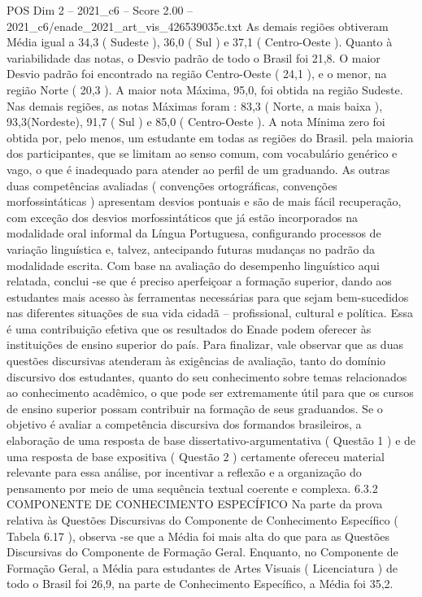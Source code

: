 \begin{textsample}{POS Dim 2 – 2021\_c6 – Score 2.00 – 2021\_c6/enade\_2021\_art\_vis\_426539035c.txt}
As demais regiões obtiveram Média igual a 34,3 ( Sudeste ), 36,0 ( Sul ) e 37,1 ( Centro-Oeste ).
Quanto à variabilidade das notas, o Desvio padrão de todo o Brasil foi 21,8.
O maior Desvio padrão foi encontrado na região Centro-Oeste ( 24,1 ), e o menor, na região Norte ( 20,3 ).
A maior nota Máxima, 95,0, foi obtida na região Sudeste.
Nas demais regiões, as notas Máximas foram : 83,3 ( Norte, a mais baixa ), 93,3(Nordeste), 91,7 ( Sul ) e 85,0 ( Centro-Oeste ).
A nota Mínima zero foi obtida por, pelo menos, um estudante em todas as regiões do Brasil. pela maioria dos participantes, que se limitam ao senso comum, com vocabulário genérico e vago, o que é inadequado para atender ao perfil de um graduando.
As outras duas competências avaliadas ( convenções ortográficas, convenções morfossintáticas ) apresentam desvios pontuais e são de mais fácil recuperação, com exceção dos desvios morfossintáticos que já estão incorporados na modalidade oral informal da Língua Portuguesa, configurando processos de variação linguística e, talvez, antecipando futuras mudanças no padrão da modalidade escrita.
Com base na avaliação do desempenho linguístico aqui relatada, conclui -se que é preciso aperfeiçoar a formação superior, dando aos estudantes mais acesso às ferramentas necessárias para que sejam bem-sucedidos nas diferentes situações de sua vida cidadã – profissional, cultural e política.
Essa é uma contribuição efetiva que os resultados do Enade podem oferecer às instituições de ensino superior do país.
Para finalizar, vale observar que as duas questões discursivas atenderam às exigências de avaliação, tanto do domínio discursivo dos estudantes, quanto do seu conhecimento sobre temas relacionados ao conhecimento acadêmico, o que pode ser extremamente útil para que os cursos de ensino superior possam contribuir na formação de seus graduandos.
Se o objetivo é avaliar a competência discursiva dos formandos brasileiros, a elaboração de uma resposta de base dissertativo-argumentativa ( Questão 1 ) e de uma resposta de base expositiva ( Questão 2 ) certamente ofereceu material relevante para essa análise, por incentivar a reflexão e a organização do pensamento por meio de uma sequência textual coerente e complexa. 6.3.2 COMPONENTE DE CONHECIMENTO ESPECÍFICO Na parte da prova relativa às Questões Discursivas do Componente de Conhecimento Específico ( Tabela 6.17 ), observa -se que a Média foi mais alta do que para as Questões Discursivas do Componente de Formação Geral.
Enquanto, no Componente de Formação Geral, a Média para estudantes de Artes Visuais ( Licenciatura ) de todo o Brasil foi 26,9, na parte de Conhecimento Específico, a Média foi 35,2.

\end{textsample}
